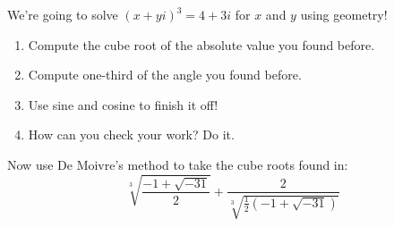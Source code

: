 \documentclass{ximera}
\begin{document}
\begin{question}
We're going to solve $(x+yi)^3 = 4+3i$ for $x$ and $y$ using geometry!
\begin{enumerate}
\item Compute the cube root of the absolute value you found before. 
\item Compute one-third of the angle you found before. 
\item Use sine and cosine to finish it off!
\item How can you check your work? Do it.
\end{enumerate}
\end{question}


\begin{question}
Now use De Moivre's method to take the cube roots found in:
\[
\sqrt[3]{\frac{-1+\sqrt{-31}}{2}} + \frac{2}{\sqrt[3]{\frac{1}{2}(-1+\sqrt{-31})}}
\]
\end{question}
\end{document}

